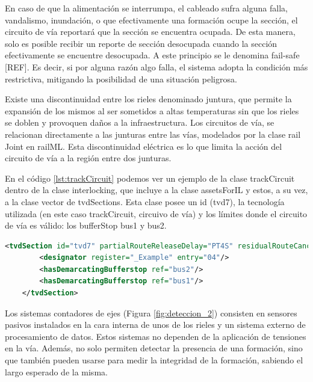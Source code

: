     En caso de que la alimentación se interrumpa, el cableado sufra alguna falla, vandalismo, inundación, o que efectivamente una formación ocupe la sección, el circuito de vía reportará que la sección se encuentra ocupada. De esta manera, solo es posible recibir un reporte de sección desocupada cuando la sección efectivamente se encuentre desocupada. A este principio se le denomina fail-safe [REF]. Es decir, si por alguna razón algo falla, el sistema adopta la condición más restrictiva, mitigando la posibilidad de una situación peligrosa. 
    
    Existe una discontinuidad entre los rieles denominado juntura, que permite la expansión de los mismos al ser sometidos a altas temperaturas sin que los rieles se doblen y provoquen daños a la infraestructura. Los circuitos de vía, se relacionan directamente a las junturas entre las vías, modelados por la clase rail Joint en railML.  Esta discontinuidad eléctrica es lo que limita la acción del circuito de vía a la región entre dos junturas.

    En el código \ref{lst:trackCircuit} podemos ver un ejemplo de la clase trackCircuit dentro de la clase interlocking, que incluye a la clase assetsForIL y estos, a su vez, a la clase vector de tvdSections. Esta clase posee un id (tvd7), la tecnología utilizada (en este caso trackCircuit, circuivo de vía) y los límites donde el circuito de vía es válido: los bufferStop bus1 y bus2.

    \begin{lstlisting}[language = XML, caption = Clase trackCircuit , label = {lst:trackCircuit}]
    <tvdSection id="tvd7" partialRouteReleaseDelay="PT4S" residualRouteCancellationDelay="PT90S" technology="trackCircuit" isBerthingTrack="false">
        <designator register="_Example" entry="04"/>
        <hasDemarcatingBufferstop ref="bus2"/>
        <hasDemarcatingBufferstop ref="bus1"/>
    </tvdSection>
    \end{lstlisting}

    Los sistemas contadores de ejes (Figura \ref{fig:deteccion_2}) consisten en sensores pasivos instalados en la cara interna de unos de los rieles y un sistema externo de procesamiento de datos. Estos sistemas no dependen de la aplicación de tensiones en la vía. Además, no solo permiten detectar la presencia de una formación, sino que también pueden usarse para medir la integridad de la formación, sabiendo el largo esperado de la misma. 

